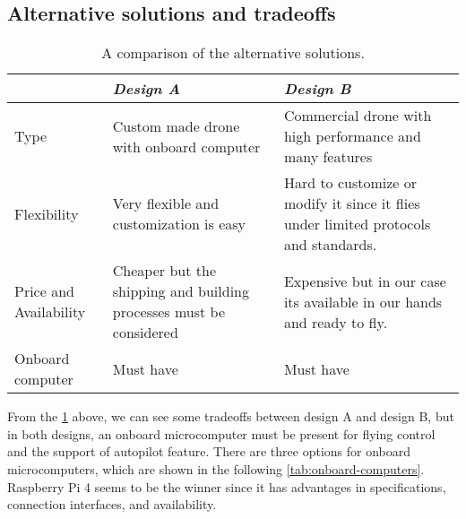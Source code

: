 \documentclass[../main.tex]{subfiles}
\begin{document}
\subsection{Alternative solutions and tradeoffs}

\begin{table}[H]
    \centering
    \caption{A comparison of the alternative solutions.}
    \label{tab:alt-solutions}
    \begin{tabular}{ p{4cm} p{6cm} p{6cm} }
        \toprule
        \textit{} & \textit{Design A} & \textit{Design B}\\ \midrule
        Type  & Custom made drone with onboard computer & Commercial drone with high performance and many features    \\
        Flexibility & Very flexible and customization is easy & Hard to customize or modify it since it flies under limited protocols and standards. \\

        Price and Availability & Cheaper but the shipping and building processes must be considered & Expensive but in our case its available in our hands and ready to fly.   \\

        Onboard computer & Must have & Must have \\
        \bottomrule
    \end{tabular}
\end{table} 

From the \cref{tab:alt-solutions} above, 
we can see some tradeoffs 
between design A and design B, but in both designs, 
an onboard microcomputer must be present for 
flying control and the support of autopilot feature. 
There are three options for onboard microcomputers, 
which are shown in the following 
\cref{tab:onboard-computers}. Raspberry Pi 4 seems to be the winner since it has advantages in specifications, connection interfaces, and availability.
\end{document}
